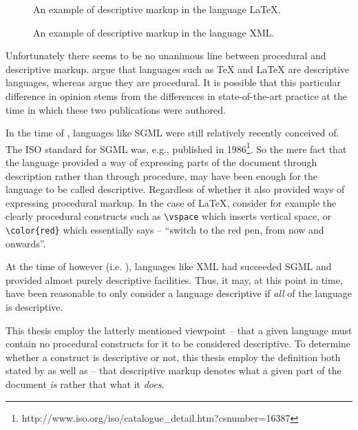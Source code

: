 \documentclass{scrreprt}
\begin{document}
\begin{figure}[h]
\centering
{}
\caption{An example of descriptive markup in the language \LaTeX{}.}
\label{fig:descriptive-markup-red-sentence-latex}
\end{figure}



\begin{figure}[h]
\centering
{}
\caption{An example of descriptive markup in the language XML.}
\label{fig:descriptive-markup-red-sentence-xml}
\end{figure}

Unfortunately there seems to be no unanimous line between procedural and descriptive markup. \citet{coombs} argue that languages such as \TeX{} and \LaTeX{} are descriptive languages, whereas \citet{bray} argue they are procedural. It is possible that this particular difference in opinion stems from the differences in state-of-the-art practice at the time in which these two publications were authored.

In the time of \citet{coombs}, languages like SGML were still relatively recently conceived of. The ISO standard for SGML was, e.g., published in 1986\footnote{http://www.iso.org/iso/catalogue\_detail.htm?csnumber=16387}. So the mere fact that the language provided a way of expressing parts of the document through description rather than through procedure, may have been enough for the language to be called descriptive. Regardless of whether it also provided ways of expressing procedural markup. In the case of \LaTeX{}, consider for example the clearly procedural constructs such as \texttt{\textbackslash vspace} which inserts vertical space, or  \texttt{\textbackslash color\{red\}} which essentially says -- ``switch to the red pen, from now and onwards''.

At the time of \citet{bray} however (i.e. \citeyear{bray}), languages like XML had succeeded SGML and provided almost purely descriptive facilities. Thus, it may, at this point in time, have been reasonable to only consider a language descriptive if \emph{all} of the language is descriptive.

This thesis employ the latterly mentioned viewpoint -- that a given language must contain no procedural constructs for it to be considered descriptive. To determine whether a construct is descriptive or not, this thesis employ the definition both stated by \citet{coombs} as well as \citet{bray} -- that descriptive markup denotes what a given part of the document \emph{is} rather that what it \emph{does}.
\end{document}
